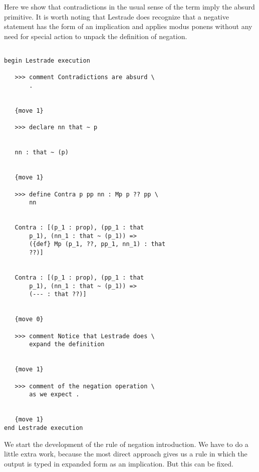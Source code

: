 \documentclass[12pt]{article}
\begin{document}
Here we show that contradictions in the usual sense of the term imply the absurd primitive.  It is worth noting that Lestrade
does recognize that a negative statement has the form of an implication and applies modus ponens without any need for special action to unpack the definition of negation.

\begin{verbatim}

begin Lestrade execution

   >>> comment Contradictions are absurd \
       .


   {move 1}

   >>> declare nn that ~ p


   nn : that ~ (p)


   {move 1}

   >>> define Contra p pp nn : Mp p ?? pp \
       nn


   Contra : [(p_1 : prop), (pp_1 : that 
       p_1), (nn_1 : that ~ (p_1)) => 
       ({def} Mp (p_1, ??, pp_1, nn_1) : that 
       ??)]


   Contra : [(p_1 : prop), (pp_1 : that 
       p_1), (nn_1 : that ~ (p_1)) => 
       (--- : that ??)]


   {move 0}

   >>> comment Notice that Lestrade does \
       expand the definition


   {move 1}

   >>> comment of the negation operation \
       as we expect .


   {move 1}
end Lestrade execution
\end{verbatim}

We start the development of the rule of negation introduction.   We have to do a little extra work, because the most direct approach gives us a rule
in which the output is typed in expanded form as an implication.   But this can be fixed.
\end{document}

